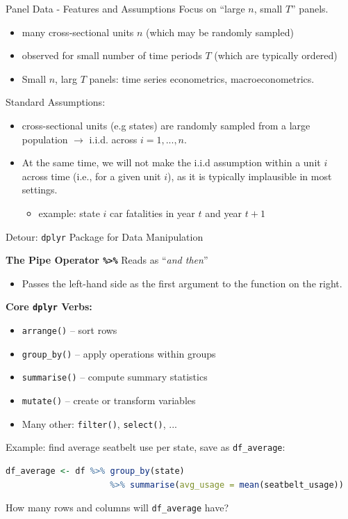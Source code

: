 \documentclass[11pt, aspectratio = 169]{beamer}
\begin{document}
\begin{frame}{Panel Data - Features and Assumptions}
Focus on “large $n$, small $T$” panels.
\begin{itemize}
    \item many cross-sectional units $n$ (which may be randomly sampled) 
    \item observed for small number of time periods $T$ (which are typically ordered) \pause
    \item[$\rightarrow$] Small $n$, larg $T$ panels: time series econometrics, macroeconometrics. 
\end{itemize} 
\pause
\medskip 
Standard Assumptions:
\begin{itemize}
    \item cross-sectional units (e.g states) are \alert{randomly} sampled from a large population $\rightarrow$ i.i.d. across $i = 1, ... , n$.
    \item At the same time, we will \alert{not} make the i.i.d assumption within a unit $i$ across time (i.e., for a given unit $i$), as it is typically implausible in most settings.
    \small 
    \begin{itemize}
        \item example: state $i$ car fatalities in year $t$ and year $t+1$ 
    \end{itemize} 
\end{itemize}
\end{frame}

\begin{frame}[fragile]{Detour: \texttt{dplyr} Package for Data Manipulation}

\textbf{The Pipe Operator \texttt{\%>\%}} Reads as “\textit{and then}”
\vspace{-0.15cm}
\begin{itemize}
    \item Passes the left-hand side as the first argument to the function on the right.
\end{itemize}
\pause
\textbf{Core \texttt{dplyr} Verbs:}
\vspace{-0.15cm}
\begin{itemize}
    \item \texttt{arrange()} – sort rows
    \item \texttt{group\_by()} – apply operations within groups
    \item \texttt{summarise()} – compute summary statistics
    \item \texttt{mutate()} – create or transform variables
    \item Many other: \texttt{filter()}, \texttt{select()}, ...
\end{itemize}
\pause
Example: find average seatbelt use per state, save as \texttt{df\_average}:
\begin{lstlisting}[language=R]
    df_average <- df %>% group_by(state) 
                     %>% summarise(avg_usage = mean(seatbelt_usage))
\end{lstlisting}
\pause
\vspace{-0.2cm}
\begin{center}
    How many rows and columns will \texttt{df\_average} have? 
\end{center}
\end{frame}
\end{document}
